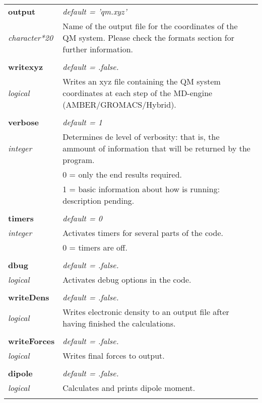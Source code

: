 \begin{Spacing}{1.0}
\begin{longtable}{ p{} p{} }
   \textbf{output}
   &  \textit{default = 'qm.xyz' }
   \\*\textit{character*20}
   & Name of the output file for the coordinates of the
   QM system. Please check the formats section for further
   information.\\* \\

   \textbf{writexyz}
   &  \textit{default = .false. }
   \\*\textit{logical}
   & Writes an xyz file containing the QM system
   coordinates at each step of the MD-engine
   (AMBER/GROMACS/Hybrid).\\* \\

   \textbf{verbose}
   &  \textit{default = 1 }
   \\*\textit{integer}
   & Determines de level of verbosity: that is, the
   ammount of    information that will be returned by
   the program.\\*
   &     0 = only the end results required.\\*
   &     1 = basic information about how is running:
   description pending.\\* \\

   \textbf{timers}
   &  \textit{default = 0}
   \\*\textit{integer}
   & Activates timers for several parts of the code.\\*
   &     0 = timers are off.\\* \\

   \textbf{dbug}
   &  \textit{default = .false. }
   \\*\textit{logical}
   & Activates debug options in the code.\\* \\

   \textbf{writeDens}
   &  \textit{default = .false. }
   \\*\textit{logical}
   & Writes electronic density to an output file after
   having finished the calculations.\\* \\

   \textbf{writeForces}
   &  \textit{default = .false. }
   \\*\textit{logical}
   & Writes final forces to output.\\* \\

   \textbf{dipole}
   &  \textit{default = .false. }
   \\*\textit{logical}
   & Calculates and prints dipole moment.\\* \\


\end{longtable}
\end{Spacing}

